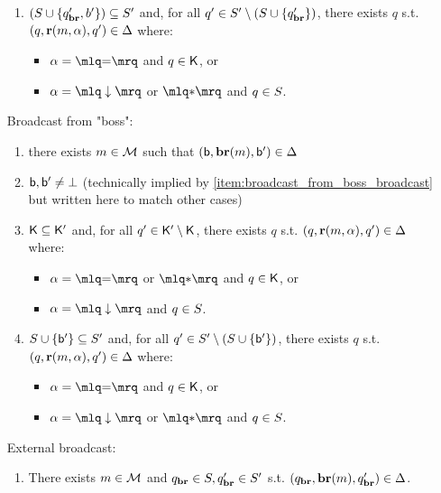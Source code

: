 \begin{definition}
\begin{enumerate}
\begin{enumerate}[label=(\roman*)]
		\item\label{item:broadcast_from_clique_covset}$(S \cup \{q_{\textbf{br}}', b'\}) \subseteq S'$  and, for all $q' \in S' \setminus (S \cup \{q_{\textbf{br}}'\})$, there exists $q$ s.t. $(q, \textbf{r}(m, \alpha), q') \in \Delta$ where:
		\begin{itemize}
			\item  $\anact = \quotemarks{\eqtestact}$ and $q \in \mathsf{K}$, or
			\item $\anact = \quotemarks{\enregact}$ or $\quotemarks{\dummyact}$ and $q \in S$.
		\end{itemize}
	\end{enumerate}
	\item[Broadcast from "boss":] 
	\begin{enumerate}[label=(\roman*)]
		\item \label{item:broadcast_from_boss_broadcast} there exists $m \in \mathcal{M}$ such that $(\mathsf{b}, \textbf{br}(m), \mathsf{b}') \in \Delta$
		
		\item\label{item:broadcast_from_boss_boss} $\mathsf{b}, \mathsf{b}' \ne \bot$ (technically implied by \ref{item:broadcast_from_boss_broadcast} but written here to match other cases)

		\item\label{item:broadcast_from_boss_clique} 	$\mathsf{K} \subseteq \mathsf{K}'$ and, for all $q' \in \mathsf{K}' \setminus \mathsf{K}$, there exists $q$ s.t. $(q, \textbf{r}(m, \alpha), q') \in \Delta$ where:
		\begin{itemize}
			\item $\anact = \quotemarks{\eqtestact}$ or $\quotemarks{\dummyact}$ and $q \in \mathsf{K}$, or
			\item $\anact= \quotemarks{\enregact}$ and $q \in S$.
		\end{itemize}
				
		\item\label{item:broadcast_from_boss_covset} $S \cup \{\mathsf{b}'\} \subseteq S'$ and, for all $q' \in S' \setminus (S \cup \{\mathsf{b}'\})$, there exists $q$ s.t. $(q, \textbf{r}(m, \alpha), q') \in \Delta$ where:
		\begin{itemize}
			\item  $\anact = \quotemarks{\eqtestact}$ and $q \in \mathsf{K}$, or
			\item $\anact = \quotemarks{\enregact}$ or $\quotemarks{\dummyact}$ and $q \in S$.
		\end{itemize}
	\end{enumerate}
	\item[External broadcast:] 
	\begin{enumerate}[label=(\roman*)]
		\item\label{item:external_broadcast_broadcast} There exists $m \in \mathcal{M}$ and $q_{\textbf{br}} \in S, q_{\textbf{br}}' \in S'$ s.t. $(q_{\textbf{br}}, \textbf{br}(m), q_{\textbf{br}}') \in \Delta$. 
	

\end{enumerate}
\end{enumerate}
\end{definition}
